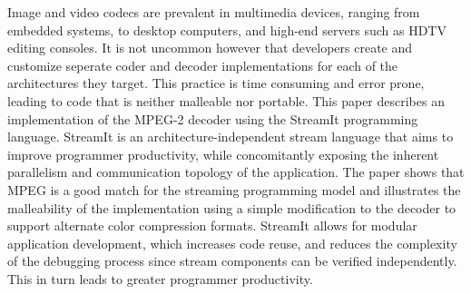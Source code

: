 Image and video codecs are prevalent in multimedia devices, ranging
from embedded systems, to desktop computers, and high-end servers such
as HDTV editing consoles. It is not uncommon however that developers
create and customize seperate coder and decoder implementations for
each of the architectures they target. This practice is time 
consuming and error prone, leading to
code that is neither malleable nor portable. This paper describes an
implementation of the MPEG-2 decoder using the StreamIt programming
language. StreamIt is an architecture-independent stream language that
aims to improve programmer productivity, while concomitantly exposing
the inherent parallelism and communication topology of the
application. The paper shows that MPEG is a good match for the
streaming programming model and illustrates the malleability of the
implementation using a simple modification to the decoder to support
alternate color compression formats. StreamIt allows for modular
application development, which increases code reuse, and reduces the
complexity of the debugging process since stream components can be
verified independently. This in turn leads to greater programmer
productivity.
